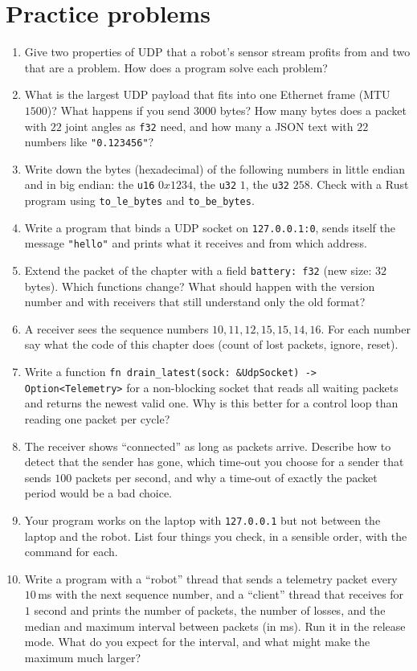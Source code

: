 \section*{Practice problems}
\begin{enumerate}[label=\textbf{\thechapter.\arabic*}]
  \item Give two properties of UDP that a robot's sensor stream profits from and two that are a problem. How does a program solve each problem?
  \item What is the largest UDP payload that fits into one Ethernet frame (MTU $1500$)? What happens if you send $3000$ bytes? How many bytes does a packet with $22$ joint angles as \verb!f32! need, and how many a JSON text with $22$ numbers like \verb!"0.123456"!?
  \item Write down the bytes (hexadecimal) of the following numbers in little endian and in big endian: the \verb!u16! $0x1234$, the \verb!u32! $1$, the \verb!u32! $258$. Check with a Rust program using \verb!to_le_bytes! and \verb!to_be_bytes!.
  \item Write a program that binds a UDP socket on \verb!127.0.0.1:0!, sends itself the message \verb!"hello"! and prints what it receives and from which address.
  \item Extend the packet of the chapter with a field \verb!battery: f32! (new size: $32$ bytes). Which functions change? What should happen with the version number and with receivers that still understand only the old format?
  \item A receiver sees the sequence numbers $10,11,12,15,15,14,16$. For each number say what the code of this chapter does (count of lost packets, ignore, reset).
  \item Write a function \verb!fn drain_latest(sock: &UdpSocket) -> Option<Telemetry>! for a non-blocking socket that reads all waiting packets and returns the newest valid one. Why is this better for a control loop than reading one packet per cycle?
  \item The receiver shows ``connected'' as long as packets arrive. Describe how to detect that the sender has gone, which time-out you choose for a sender that sends $100$ packets per second, and why a time-out of exactly the packet period would be a bad choice.
  \item Your program works on the laptop with \verb!127.0.0.1! but not between the laptop and the robot. List four things you check, in a sensible order, with the command for each.
  \item[\textbf{\thechapter.10}$\star$] Write a program with a ``robot'' thread that sends a telemetry packet every $10$\,ms with the next sequence number, and a ``client'' thread that receives for $1$ second and prints the number of packets, the number of losses, and the median and maximum interval between packets (in ms). Run it in the release mode. What do you expect for the interval, and what might make the maximum much larger?
\end{enumerate}
